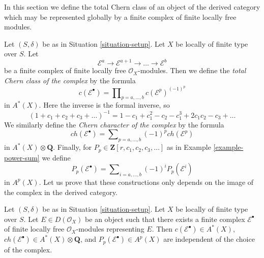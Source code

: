 \noindent
In this section we define the total Chern class of an object
of the derived category which may be represented globally
by a finite complex of finite locally free modules.

\medskip\noindent
Let $(S, \delta)$ be as in Situation \ref{situation-setup}.
Let $X$ be locally of finite type over $S$. Let
$$
\mathcal{E}^a \to \mathcal{E}^{a + 1} \to \ldots \to \mathcal{E}^b
$$
be a finite complex of finite locally free $\mathcal{O}_X$-modules.
Then we define the {\it total Chern class of the complex} by the formula
$$
c(\mathcal{E}^\bullet) = \prod\nolimits_{p = a, \ldots, b}
c(\mathcal{E}^p)^{(-1)^p}
$$
in $A^*(X)$. Here the inverse is the formal inverse, so
$$
(1 + c_1 + c_2 + c_3 + \ldots)^{-1} =
1 - c_1 + c_1^2 - c_2 - c_1^3 + 2c_1 c_2 - c_3 + \ldots
$$
We similarly define the {\it Chern character of the complex} by
the formula
$$
ch(\mathcal{E}^\bullet) = \sum\nolimits_{p = a, \ldots, b}
(-1)^p ch(\mathcal{E}^p)
$$
in $A^*(X) \otimes \mathbf{Q}$. Finally, for
$P_p \in \mathbf{Z}[r, c_1, c_2, c_3, \ldots]$
as in Example \ref{example-power-sum} we define
$$
P_p(\mathcal{E}^\bullet) = \sum\nolimits_{i = a, \ldots, b}
(-1)^i P_p(\mathcal{E}^i)
$$
in $A^p(X)$. Let us prove that these constructions only depends
on the image of the complex in the derived category.

\begin{lemma}
\label{lemma-pre-derived-chern-class}
Let $(S, \delta)$ be as in Situation \ref{situation-setup}.
Let $X$ be locally of finite type over $S$. Let $E \in D(\mathcal{O}_X)$
be an object such that there exists a finite complex $\mathcal{E}^\bullet$
of finite locally free $\mathcal{O}_X$-modules representing $E$.
Then $c(\mathcal{E}^\bullet) \in A^*(X)$,
$ch(\mathcal{E}^\bullet) \in A^*(X) \otimes \mathbf{Q}$, and
$P_p(\mathcal{E}^\bullet) \in A^p(X)$
are independent of the choice of the complex.
\end{lemma}


